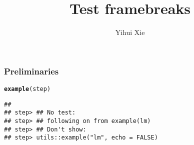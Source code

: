 \documentclass{beamer}\usepackage[]{graphicx}\usepackage[]{color}
\title{Test framebreaks}
\author{Yihui Xie}
\newcommand{\hlstd}[1]{\textcolor[rgb]{0.345,0.345,0.345}{#1}}%
\newcommand{\hlkwd}[1]{\textcolor[rgb]{0.737,0.353,0.396}{\textbf{#1}}}%
\newenvironment{knitrout}{}{} %
\begin{document}
\maketitle


\begin{frame}
\frametitle{Preliminaries}
\begin{knitrout}\footnotesize
{}\color{fgcolor}
\begin{alltt}
\hlkwd{example}\hlstd{(step)}
\end{alltt}
\begin{verbatim}
## 
## step> ## No test: 
## step> ## following on from example(lm)
## step> ## Don't show: 
## step> utils::example("lm", echo = FALSE)
\end{verbatim}


\end{knitrout}
\end{frame}
\end{document}
